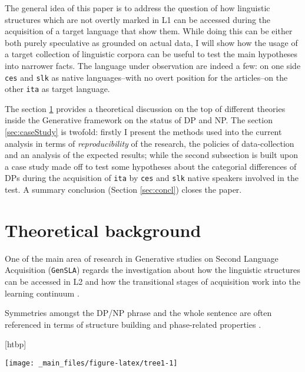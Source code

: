 \documentclass[a4paper,twoside,12pt,chapterprefix=false,listof=flat]{scrartcl}
\makeatletter
\def\fps@figure{htbp}
\renewenvironment{figure}[1][\fps@figure]{
  \edef\@tempa{\noexpand\@float{figure}[#1]} 
  \@tempa
  \sffamily
}{
  \end@float
}
\theoremstyle{plain} %
\theoremstyle{definition}
\theoremstyle{remark}
\makeatother
\begin{document}
The general idea of this paper is to address the question of how
linguistic structures which are not overtly marked in L1 can be accessed
during the acquisition of a target language that show them. While doing
this can be either both purely speculative as grounded on actual data, I
will show how the usage of a target collection of linguistic corpora can
be useful to test the main hypotheses into narrower facts. The language
under observation are indeed a few: on one side \texttt{ces} and
\texttt{slk} as native languages--with no overt position for the
articles--on the other \texttt{ita} as target language.

The section \ref{sec:theoryBg} provides a theoretical discussion on the
top of different theories inside the Generative framework
\citep{chomsky1995} on the status of DP and NP. The section
\ref{sec:caseStudy} is twofold: firstly I present the methods used into
the current analysis in terms of \emph{reproducibility} of the research,
the policies of data-collection and an analysis of the expected results;
while the second subsection is built upon a case study made off to test
some hypotheses about the categorial differences of DPs during the
acquisition of \texttt{ita} by \texttt{ces} and \texttt{slk} native
speakers involved in the test. A summary conclusion (Section
\ref{sec:concl}) closes the paper.

\section{Theoretical background}\label{sec:theoryBg}

One of the main area of research in Generative studies on Second
Language Acquisition (\texttt{GenSLA}) regards the investigation about
how the linguistic structures can be accessed in L2 and how the
transitional stages of acquisition work into the learning continuum
\citep{rothmanslabakova2017}.

Symmetries amongst the DP/NP phrase and the whole sentence are often
referenced in terms of structure building and phase-related properties
\citep{chomsky2013, chomsky2015}.

\begin{figure}

{\centering \texttt{[image: \_main\_files/figure-latex/tree1-1]} 

}

\caption{Structural comparison between NP-over-DP and DP-over-NP Hypotheses}\label{fig:tree1}
\end{figure}
\end{document}
